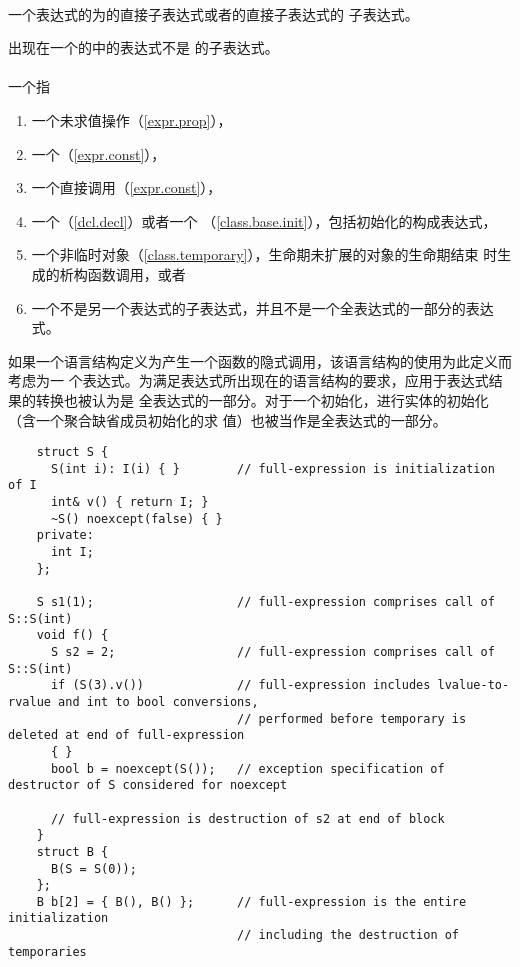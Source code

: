 \paragraph{} %
一个表达式的为的直接子表达式或者的直接子表达式的
子表达式。

\begin{note}
  出现在一个的中的表达式不是
  的子表达式。
\end{note}

\paragraph{} %
一个指
\begin{enumerate}
  \item 一个未求值操作（\ref{expr.prop}），
  \item 一个（\ref{expr.const}），
  \item 一个直接调用（\ref{expr.const}），
  \item 一个（\ref{dcl.decl}）或者一个
        （\ref{class.base.init}），包括初始化的构成表达式，
  \item 一个非临时对象（\ref{class.temporary}），生命期未扩展的对象的生命期结束
        时生成的析构函数调用，或者
  \item 一个不是另一个表达式的子表达式，并且不是一个全表达式的一部分的表达式。
\end{enumerate}
如果一个语言结构定义为产生一个函数的隐式调用，该语言结构的使用为此定义而考虑为一
个表达式。为满足表达式所出现在的语言结构的要求，应用于表达式结果的转换也被认为是
全表达式的一部分。对于一个初始化，进行实体的初始化（含一个聚合缺省成员初始化的求
值）也被当作是全表达式的一部分。

\begin{example}
  \begin{lstlisting}
    struct S {
      S(int i): I(i) { }        // full-expression is initialization of I
      int& v() { return I; }
      ~S() noexcept(false) { }
    private:
      int I;
    };

    S s1(1);                    // full-expression comprises call of S::S(int)
    void f() {
      S s2 = 2;                 // full-expression comprises call of S::S(int)
      if (S(3).v())             // full-expression includes lvalue-to-rvalue and int to bool conversions,
                                // performed before temporary is deleted at end of full-expression
      { }
      bool b = noexcept(S());   // exception specification of destructor of S considered for noexcept

      // full-expression is destruction of s2 at end of block
    }
    struct B {
      B(S = S(0));
    };
    B b[2] = { B(), B() };      // full-expression is the entire initialization
                                // including the destruction of temporaries
  \end{lstlisting}
\end{example}

